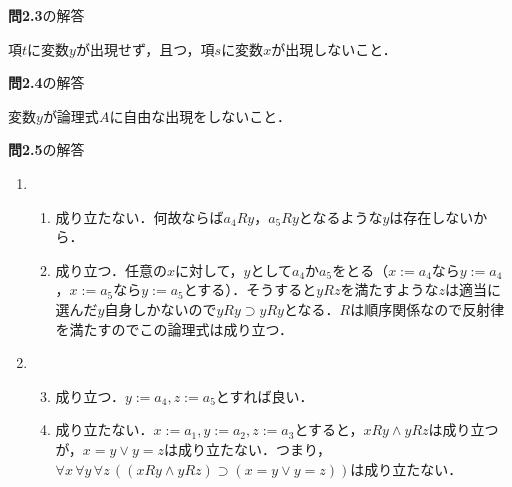 \documentclass[11pt,dvipdfmx]{jreport}
\begin{document}
\noindent \textbf{問2.3}の解答
\par
項$t$に変数$y$が出現せず，且つ，項$s$に変数$x$が出現しないこと．%

\par
\vspace{7mm}

\noindent \textbf{問2.4}の解答 
\par
変数$y$が論理式$A$に自由な出現をしないこと．

\par
\vspace{7mm}

\noindent \textbf{問2.5}の解答 
\renewcommand{\labelenumi}{(\arabic{enumi}) }
\renewcommand{\labelenumii}{\arabic{enumii}) }
\begin{enumerate}
 \item 
  \begin{enumerate}
   \item 成り立たない．何故ならば$a_{4}Ry$，$a_{5}Ry$となるような$y$は存在しないから．
   \item 成り立つ．任意の$x$に対して，$y$として$a_{4}$か$a_{5}$をとる（$x := a_{4}$なら$y := a_{4}$，$x := a_{5}$なら$y := a_{5}$とする）．そうすると$yRz$を満たすような$z$は適当に選んだ$y$自身しかないので$yRy \supset yRy$となる．$R$は順序関係なので反射律を満たすのでこの論理式は成り立つ．
  \end{enumerate}
 \item 
　\begin{enumerate}
   \setcounter{enumii}{2}
   \item 成り立つ．$y := a_{4}, z := a_{5}$とすれば良い．
   \item 成り立たない．$x := a_{1}, y := a_{2}, z := a_{3}$とすると，$xRy \land yRz$は成り立つが，$x = y \lor y = z$は成り立たない．つまり，$\forall x \, \forall y \, \forall z \, ((xRy \land yRz) \supset (x=y \lor y = z))$は成り立たない．
 \end{enumerate}
\end{enumerate}

\par
\vspace{5mm}
\end{document}
